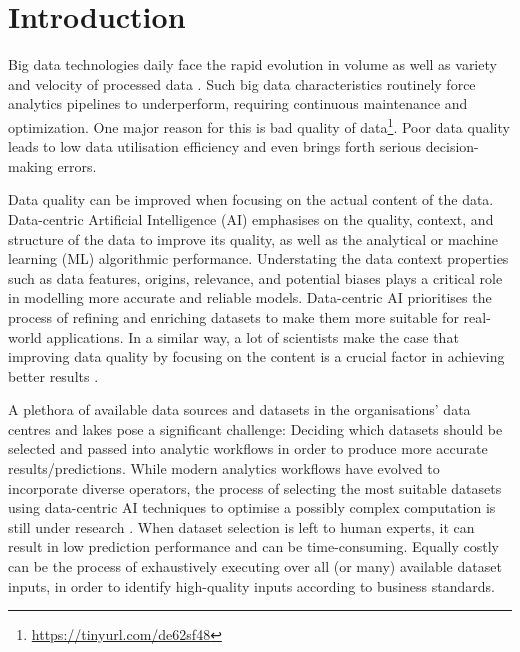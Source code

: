 \section{Introduction}

Big data technologies daily face the rapid evolution in volume as well as variety and velocity of processed data \cite{b1Intdata_quality_for_data_scienceBenjaminHazen}. Such big data characteristics routinely force analytics pipelines to underperform, requiring continuous maintenance and optimization. One major reason for this is bad quality of data\footnote{\href{https://tinyurl.com/de62sf48}{https://tinyurl.com/de62sf48}}. Poor data quality leads to low data utilisation efficiency and even brings forth serious decision-making errors\cite{b2DataQualityBigDataChai}.

Data quality can be improved when focusing on the actual content of the data. Data-centric Artificial Intelligence (AI) \cite{b3IntDataCentricAI} emphasises on the quality, context, and structure of the data to improve its quality, as well as the analytical or machine learning (ML) algorithmic performance. Understating the data context properties such as data features, origins, relevance, and potential biases plays a critical role in modelling more accurate and reliable models. Data-centric AI prioritises the process of refining and enriching datasets to make them more suitable for real-world applications. In a similar way, a lot of scientists make the case that improving data quality by focusing on the content is a crucial factor in achieving better results \cite{b3IntDataCentricAI}.

A plethora of available data sources and datasets in the organisations' data centres and lakes pose a significant challenge: Deciding which datasets should be selected and passed into analytic workflows in order to produce more accurate results/predictions. While modern analytics workflows have evolved to incorporate diverse operators, the process of selecting the most suitable datasets using data-centric AI techniques to optimise a possibly complex computation is still under research \cite{b4IntDataCentricAI2}. When dataset selection is left to human experts, it can result in low prediction performance and can be time-consuming. Equally costly can be the process of exhaustively executing over all (or many) available dataset inputs, in order to identify high-quality inputs according to business standards. 

